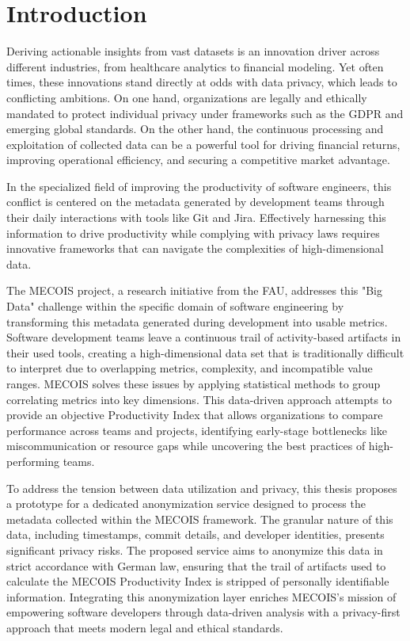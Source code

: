 \chapter{Introduction}
\label{chapter:introduction}

Deriving actionable insights from vast datasets is an innovation driver across different industries, from healthcare analytics to financial modeling. Yet often times, these innovations stand directly at odds with data privacy, which leads to conflicting ambitions. On one hand, organizations are legally and ethically mandated to protect individual privacy under frameworks such as the \ac{GDPR} and emerging global standards. On the other hand, the continuous processing and exploitation of collected data can be a powerful tool for driving financial returns, improving operational efficiency, and securing a competitive market advantage.

In the specialized field of improving the productivity of software engineers, this conflict is centered on the metadata generated by development teams through their daily interactions with tools like Git and Jira. Effectively harnessing this information to drive productivity while complying with privacy laws requires innovative frameworks that can navigate the complexities of high-dimensional data.

The MECOIS project, a research initiative from the \ac{FAU}, addresses this "Big Data" challenge within the specific domain of software engineering by transforming this metadata generated during development into usable metrics. Software development teams leave a continuous trail of activity-based artifacts in their used tools, creating a high-dimensional data set that is traditionally difficult to interpret due to overlapping metrics, complexity, and incompatible value ranges. MECOIS solves these issues by applying statistical methods to group correlating metrics into key dimensions. This data-driven approach attempts to provide an objective Productivity Index that allows organizations to compare performance across teams and projects, identifying early-stage bottlenecks like miscommunication or resource gaps while uncovering the best practices of high-performing teams. \autocite{mecoisProductivity}

To address the tension between data utilization and privacy, this thesis proposes a prototype for a dedicated anonymization service designed to process the
metadata collected within the MECOIS framework. The granular nature of this data, including timestamps, commit details, and developer identities, presents significant privacy risks. The proposed service aims to anonymize this data in strict accordance with German law, ensuring that the trail of artifacts used to calculate the MECOIS Productivity Index is stripped of personally identifiable information. Integrating this anonymization layer enriches MECOIS’s mission of empowering software developers through data-driven analysis with a privacy-first approach that meets modern legal and ethical standards.

